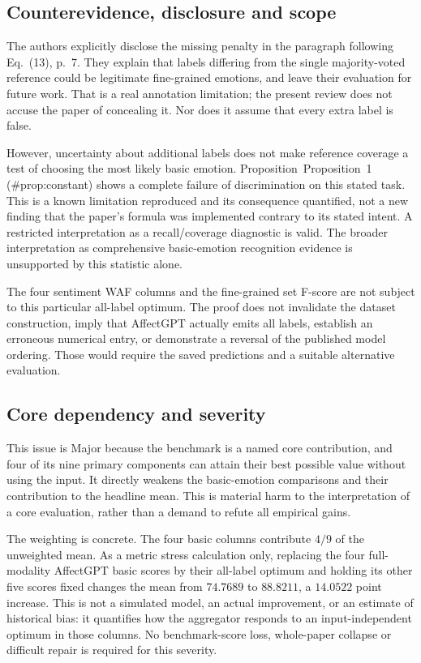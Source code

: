 \documentclass[10pt]{article}
\begin{document}
\subsection*{Counterevidence, disclosure and scope}
The authors explicitly disclose the missing penalty in the paragraph following Eq. (13), p. 7. They explain that labels differing from the single majority-voted reference could be legitimate fine-grained emotions, and leave their evaluation for future work. That is a real annotation limitation; the present review does not accuse the paper of concealing it. Nor does it assume that every extra label is false.\par
However, uncertainty about additional labels does not make reference coverage a test of choosing the most likely basic emotion. Proposition Proposition 1 (\#prop:constant) shows a complete failure of discrimination on this stated task. This is a known limitation reproduced and its consequence quantified, not a new finding that the paper’s formula was implemented contrary to its stated intent. A restricted interpretation as a recall/coverage diagnostic is valid. The broader interpretation as comprehensive basic-emotion recognition evidence is unsupported by this statistic alone.\par
The four sentiment WAF columns and the fine-grained set F-score are not subject to this particular all-label optimum. The proof does not invalidate the dataset construction, imply that AffectGPT actually emits all labels, establish an erroneous numerical entry, or demonstrate a reversal of the published model ordering. Those would require the saved predictions and a suitable alternative evaluation.\par
\subsection*{Core dependency and severity}
This issue is Major because the benchmark is a named core contribution, and four of its nine primary components can attain their best possible value without using the input. It directly weakens the basic-emotion comparisons and their contribution to the headline mean. This is material harm to the interpretation of a core evaluation, rather than a demand to refute all empirical gains.\par
The weighting is concrete. The four basic columns contribute \(4/9\) of the unweighted mean. As a metric stress calculation only, replacing the four full-modality AffectGPT basic scores by their all-label optimum and holding its other five scores fixed changes the mean from \(74.7689\) to \(88.8211\), a \(14.0522\) point increase. This is not a simulated model, an actual improvement, or an estimate of historical bias: it quantifies how the aggregator responds to an input-independent optimum in those columns. No benchmark-score loss, whole-paper collapse or difficult repair is required for this severity.\par
\end{document}
